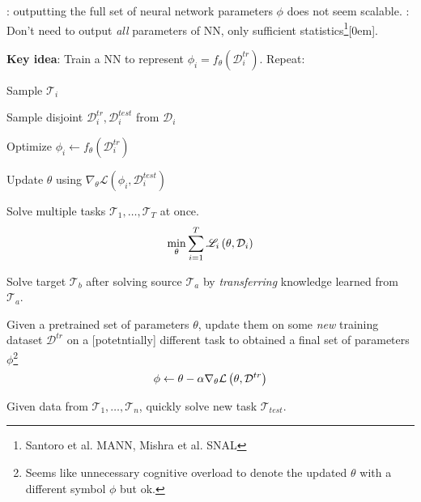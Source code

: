 \documentclass[11pt]{article}
\newcommand\task{\mathscr{T}}
\begin{document}
: outputting the full set of neural network parameters $\phi$ does not seem scalable. : Don't need to output \textit{all} parameters of NN, only sufficient statistics\footnote{Santoro et al. MANN, Mishra et al. SNAL}[0em]. 

\begin{algorithm}
	\textbf{Key idea}: Train a NN to represent $\phi_i = f_{\theta}(\mathcal{D}_i^{tr})$.  Repeat:
	\begin{compactenum}
		\item Sample $\task_i$
		\item Sample disjoint $\mathcal{D}_i^{tr}, \mathcal{D}_i^{test}$ from $\mathcal{D}_i$
		\item Optimize $\phi_i \leftarrow f_{\theta}(\mathcal{D}_i^{tr})$
		\item Update $\theta$ using $\nabla_{\theta} \mathcal L (\phi_i, \mathcal{D}_i^{test})$
	\end{compactenum}
\end{algorithm}


\begin{definition}
	Solve multiple tasks $\mathscr{T}_1, \ldots, \mathscr{T}_T$ at once. 
	$$
	\min_{\theta} \sum_{i=1}^T \mathscr{L}_i \left(  \theta, \mathcal{D}_i  \right)
	$$
\end{definition}

\begin{definition}
	Solve target $\task_b$ after solving source $\task_a$ by \textit{transferring} knowledge learned from $\task_a$. 
\end{definition}

\begin{definition}
	Given a pretrained set of parameters $\theta$, update them on some \textit{new} training dataset $\mathcal{D}^{tr}$ on a [potetntially] different task to obtained a final set of parameters $\phi$\footnote{Seems like unnecessary cognitive overload to denote the updated $\theta$ with a different symbol $\phi$ but ok.}
	$$
	\phi \leftarrow \theta - \alpha \nabla_{\theta} \mathcal L \left(  \theta, \mathcal{D}^{tr}  \right)
	$$
\end{definition}

\begin{definition}
	Given data from $\task_1, \ldots, \task_n$, quickly solve new task $\task_{test}$. 
\end{definition}
\end{document}
